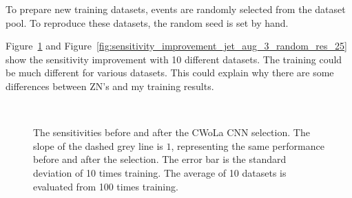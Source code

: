 \documentclass[12pt]{article}
\begin{document}
		To prepare new training datasets, events are randomly selected from the dataset pool. To reproduce these datasets, the random seed is set by hand.

		Figure~\ref{fig:sensitivity_improvement_origin_random_res_25} and Figure~\ref{fig:sensitivity_improvement_jet_aug_3_random_res_25} show the sensitivity improvement with 10 different datasets. The training could be much different for various datasets. This could explain why there are some differences between ZN's and my training results.
		\begin{figure}[htpb]
			\centering
			 \\
			\caption{The sensitivities before and after the CWoLa CNN selection. The slope of the dashed grey line is $1$, representing the same performance before and after the selection. The error bar is the standard deviation of 10 times training. The average of 10 datasets is evaluated from 100 times training.}
			\label{fig:sensitivity_improvement_origin_random_res_25}
		\end{figure}
\end{document}
